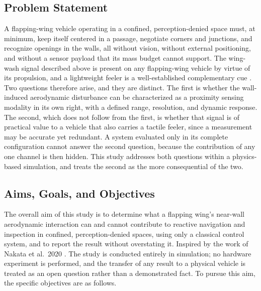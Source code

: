 \documentclass[final,5p,times]{elsarticle}
\begin{document}
\subsection{Problem Statement}
\label{sec:problem}

A flapping-wing vehicle operating in a confined, perception-denied space must, at minimum, keep itself centered in a passage, negotiate corners and junctions, and recognize openings in the walls, all without vision, without external positioning, and without a sensor payload that its mass budget cannot support. The wing-wash signal described above is present on any flapping-wing vehicle by virtue of its propulsion, and a lightweight feeler is a well-established complementary cue \cite{lee2008templates}. Two questions therefore arise, and they are distinct. The first is whether the wall-induced aerodynamic disturbance can be characterized as a proximity sensing modality in its own right, with a defined range, resolution, and dynamic response. The second, which does not follow from the first, is whether that signal is of practical value to a vehicle that also carries a tactile feeler, since a measurement may be accurate yet redundant. A system evaluated only in its complete configuration cannot answer the second question, because the contribution of any one channel is then hidden. This study addresses both questions within a physics-based simulation, and treats the second as the more consequential of the two.

\subsection{Aims, Goals, and Objectives}
\label{sec:aims}

The overall aim of this study is to determine what a flapping wing's near-wall aerodynamic interaction can and cannot contribute to reactive navigation and inspection in confined, perception-denied spaces, using only a classical control system, and to report the result without overstating it. Inspired by the work of Nakata et al.\ 2020 \cite{nakata2020aerodynamic}. The study is conducted entirely in simulation; no hardware experiment is performed, and the transfer of any result to a physical vehicle is treated as an open question rather than a demonstrated fact. To pursue this aim, the specific objectives are as follows.
\end{document}
